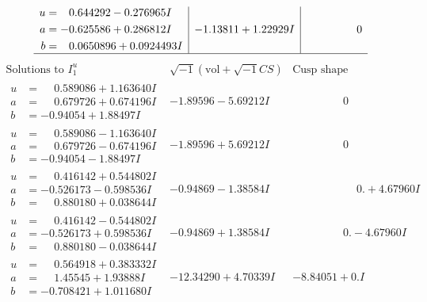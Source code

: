 \documentclass[1p]{elsarticle_modified}
\theoremstyle{definition}
\newcommand{\I}{\sqrt{-1}}
\begin{document}
$$\begin{array}{c|c|c}
\begin{aligned}
u &= \phantom{-}0.644292 - 0.276965 I \\
a &= -0.625586 + 0.286812 I \\
b &= \phantom{-}0.0650896 + 0.0924493 I\end{aligned}
 & -1.13811 + 1.22929 I & \phantom{-0.000000 } 0\\
 \hline 
 \end{array}$$\newpage$$\begin{array}{c|c|c}  
\text{Solutions to }I^u_{1}& \I (\text{vol} + \sqrt{-1}CS) & \text{Cusp shape}\\
 \hline 
\begin{aligned}
u &= \phantom{-}0.589086 + 1.163640 I \\
a &= \phantom{-}0.679726 + 0.674196 I \\
b &= -0.94054 + 1.88497 I\end{aligned}
 & -1.89596 - 5.69212 I & \phantom{-0.000000 } 0 \\ \hline\begin{aligned}
u &= \phantom{-}0.589086 - 1.163640 I \\
a &= \phantom{-}0.679726 - 0.674196 I \\
b &= -0.94054 - 1.88497 I\end{aligned}
 & -1.89596 + 5.69212 I & \phantom{-0.000000 } 0 \\ \hline\begin{aligned}
u &= \phantom{-}0.416142 + 0.544802 I \\
a &= -0.526173 - 0.598536 I \\
b &= \phantom{-}0.880180 + 0.038644 I\end{aligned}
 & -0.94869 - 1.38584 I & \phantom{-0.000000 -}0. + 4.67960 I \\ \hline\begin{aligned}
u &= \phantom{-}0.416142 - 0.544802 I \\
a &= -0.526173 + 0.598536 I \\
b &= \phantom{-}0.880180 - 0.038644 I\end{aligned}
 & -0.94869 + 1.38584 I & \phantom{-0.000000 } 0. - 4.67960 I \\ \hline\begin{aligned}
u &= \phantom{-}0.564918 + 0.383332 I \\
a &= \phantom{-}1.45545 + 1.93888 I \\
b &= -0.708421 + 1.011680 I\end{aligned}
 & -12.34290 + 4.70339 I & -8.84051 + 0. I\phantom{ +0.000000I} \\ \hline\begin{aligned}

\end{aligned}
\end{array}$$
\end{document}
